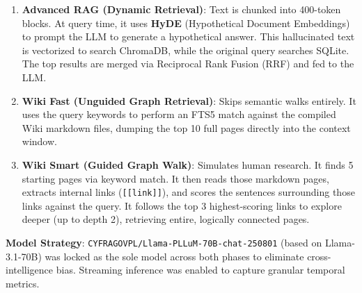 \documentclass[12pt]{article}
\begin{document}
\begin{enumerate}
    \item \textbf{Advanced RAG (Dynamic Retrieval)}: Text is chunked into 400-token blocks. At query time, it uses \textbf{HyDE} (Hypothetical Document Embeddings) to prompt the LLM to generate a hypothetical answer. This hallucinated text is vectorized to search ChromaDB, while the original query searches SQLite. The top results are merged via Reciprocal Rank Fusion (RRF) and fed to the LLM.
    \item \textbf{Wiki Fast (Unguided Graph Retrieval)}: Skips semantic walks entirely. It uses the query keywords to perform an FTS5 match against the compiled Wiki markdown files, dumping the top 10 full pages directly into the context window.
    \item \textbf{Wiki Smart (Guided Graph Walk)}: Simulates human research. It finds 5 starting pages via keyword match. It then reads those markdown pages, extracts internal links (\texttt{[[link]]}), and scores the sentences surrounding those links against the query. It follows the top 3 highest-scoring links to explore deeper (up to depth 2), retrieving entire, logically connected pages.
\end{enumerate}

\textbf{Model Strategy}: \texttt{CYFRAGOVPL/Llama-PLLuM-70B-chat-250801} (based on Llama-3.1-70B) was locked as the sole model across both phases to eliminate cross-intelligence bias. Streaming inference was enabled to capture granular temporal metrics.
\end{document}

